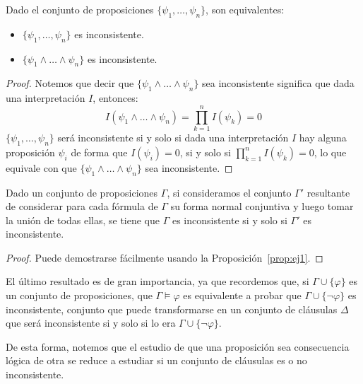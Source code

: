 \begin{prop}\label{prop:ej1}
    Dado el conjunto de proposiciones $\{\psi_1,\ldots,\psi_n\}$, son equivalentes:
    \begin{itemize}
        \item $\{\psi_1,\ldots,\psi_n\}$ es inconsistente.
        \item $\{\psi_1\land\ldots\land\psi_n\}$ es inconsistente.
    \end{itemize}
    \begin{proof}
        Notemos que decir que $\{\psi_1\land \ldots \land \psi_n\}$ sea inconsistente significa que dada una interpretación $I$, entonces:
        \begin{equation*}
            I(\psi_1\land \ldots \land \psi_n) = \prod_{k=1}^{n}I(\psi_k) = 0
        \end{equation*}
        $\{\psi_1,\ldots,\psi_n\}$ será inconsistente si y solo si dada una interpretación $I$ hay alguna proposición $\psi_i$ de forma que $I(\psi_i)=0$, si y solo si $\prod\limits_{k=1}^{n}I(\psi_k)=0$, lo que equivale con que $\{\psi_1\land\ldots\land\psi_n\}$ sea inconsistente.
    \end{proof}
\end{prop}

\begin{prop}
    Dado un conjunto de proposiciones $\Gamma$, si consideramos el conjunto $\Gamma'$ resultante de considerar para cada fórmula de $\Gamma$ su forma normal conjuntiva y luego tomar la unión de todas ellas, se tiene que $\Gamma$ es inconsistente si y solo si $\Gamma'$ es inconsistente.
    \begin{proof}
        Puede demostrarse fácilmente usando la Proposición~\ref{prop:ej1}.
    \end{proof}
\end{prop}

El último resultado es de gran importancia, ya que recordemos que, si $\Gamma\cup\{\varphi\}$ es un conjunto de proposiciones, que $\Gamma\vDash\varphi$ es equivalente a probar que $\Gamma\cup\{\lnot\varphi\}$ es inconsistente, conjunto que puede transformarse en un conjunto de cláusulas $\Delta$ que será inconsistente si y solo si lo era $\Gamma\cup\{\lnot\varphi\}$.

De esta forma, notemos que el estudio de que una proposición sea consecuencia lógica de otra se reduce a estudiar si un conjunto de cláusulas es o no inconsistente.

